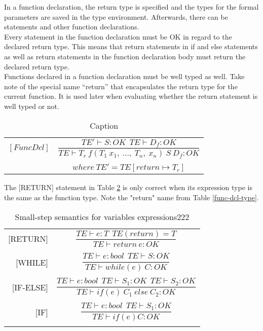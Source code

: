 In a function declaration, the return type is specified and the types for the formal parameters are saved in the type environment. Afterwards, there can be statements and other function declarations. \\
Every statement in the function declaration must be OK in regard to the declared return type. This means that return statements in if and else statements as well as return statements in the function declaration body must return the declared return type. \\
Functions declared in a function declaration must be well typed as well.
Take note of the special name “return” that encapsulates the return type for the current function. It is used later when evaluating whether the return statement is well typed or not.
\begin{table}[H]
    \begin{center}
    \begin{longtable}[c] { r c }
        $[FuncDcl]$ 
        & 
        \( \dfrac{TE' \vdash S : OK \ \ TE \vdash D_{f}: OK} 
        {T E \vdash T_r \ f(T_1 \ x_1,\ ...,\ T_n,\ x_n)\ S\ D_f : OK} \) 
        \\ \\
        & 
        \( {where \ TE' = TE[return \mapsto T_r]} \)
    \end{longtable}
    \end{center}
    \caption{Caption}
    \label{sem:func-type}
\end{table}

The [RETURN] statement in Table \ref{sem:bool-ass22} is only correct when its expression type is the same as the function type. Note the "return" name from Table \ref{func-dcl-type}.
\begin{longtable}[c] { r c }
\centering

[RETURN] & \(
\dfrac{TE \vdash e : T\ \ TE(return) = T}
  {TE \vdash return \ e : OK} \) \\
& \\

[WHILE] & \(
\dfrac{TE \vdash e : bool \ \ TE \vdash S : OK}
  {TE \vdash while(e) \ C : OK} \) \\
& \\

[IF-ELSE] & \( 
\dfrac{TE \vdash e : bool \ \ TE \vdash S_1 : OK \ \ TE \vdash S_2 : OK}
  {TE \vdash if (e) \ C_1  \ else \ C_2 : OK} \) \\
& \\

[IF] & \(
\dfrac{TE \vdash e : bool \ \ TE \vdash S_1 : OK}
  {TE \vdash if (e) C : OK} \) \\

\caption{Small-step semantics for variables expressions222}
\label{sem:bool-ass22}
\end{longtable}

